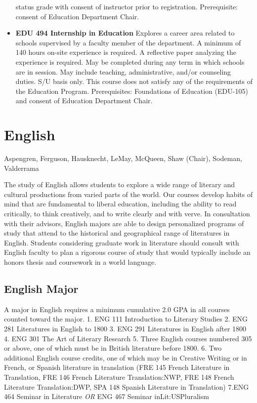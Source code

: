 \documentclass[
  letterpaper,
]{scrbook}
\begin{document}
\begin{itemize}
  status grade with consent of instructor prior to registration.
  Prerequisite: consent of Education Department Chair.\\
\item
  \textbf{EDU 494 Internship in Education} Explores a career area
  related to schools supervised by a faculty member of the department. A
  minimum of 140 hours on-site experience is required. A reflective
  paper analyzing the experience is required. May be completed during
  any term in which schools are in session. May include teaching,
  administrative, and/or counseling duties. S/U basis only. This course
  does not satisfy any of the requirements of the Education Program.
  Prerequisites: Foundations of Education (EDU-105) and consent of
  Education Department Chair.
\end{itemize}

\hypertarget{sec-english}{%
\section{English}\label{sec-english}}

Aspengren, Ferguson, Hausknecht, LeMay, McQueen, Shaw (Chair), Sodeman,
Valderrama

The study of English allows students to explore a wide range of literary
and cultural productions from varied parts of the world. Our courses
develop habits of mind that are fundamental to liberal education,
including the ability to read critically, to think creatively, and to
write clearly and with verve. In consultation with their advisors,
English majors are able to design personalized programs of study that
attend to the historical and geographical range of literatures in
English. Students considering graduate work in literature should consult
with English faculty to plan a rigorous course of study that would
typically include an honors thesis and coursework in a world language.

\hypertarget{english-major}{%
\subsection{English Major}\label{english-major}}

A major in English requires a minimum cumulative 2.0 GPA in all courses
counted toward the major. 1. ENG 111 Introduction to Literary Studies 2.
ENG 281 Literatures in English to 1800 3. ENG 291 Literatures in English
after 1800 4. ENG 301 The Art of Literary Research 5. Three English
courses numbered 305 or above, one of which must be in British
literature before 1800. 6. Two additional English course credits, one of
which may be in Creative Writing or in French, or Spanish literature in
translation (FRE 145 French Literature in Translation, FRE 146 French
Literature Translation:NWP, FRE 148 French Literature Translation:DWP,
SPA 148 Spanish Literature in Translation) 7.ENG 464 Seminar in
Literature \emph{OR} ENG 467 Seminar inLit:USPluralism
\end{document}
